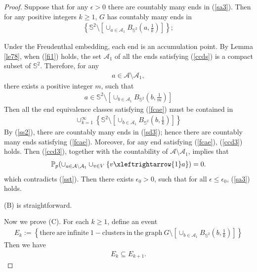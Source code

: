 \documentclass[11pt]{amsart}
\theoremstyle{plain}
\numberwithin{equation}{section}
\numberwithin{figure}{section}
\newcommand\PP{{\mathbb P}}
\begin{document}
\begin{proof}

Suppose that for any $\epsilon>0$ there are countably many ends in (\ref{sa3}). Then for any positive integers $k\geq 1$, $G$ has countably many ends in
\begin{align}
 \left\{\mathbb{S}^2\setminus \left[\cup_{a\in\mathcal{A}_1}B_{\mathbb{S}^2}\left(a,\frac{1}{k}\right)\right]\right\};\label{ss2}
\end{align}

Under the Freudenthal embedding, each end is an accumulation point.
By Lemma \ref{le78}, when (\ref{fi1}) holds, the set $\mathcal{A}_1$ of all the ends satisfying (\ref{ccds}) is a compact subset of $\mathbb{S}^2$. Therefore, for any  
\begin{align}
a\in\mathcal{A}\setminus \mathcal{A}_1,\label{fcae}
\end{align}
there exists a positive integer $m$, such that
\begin{align*}
a\in \mathbb{S}^2\setminus \left[\cup_{b\in\mathcal{A}_1}B_{\mathbb{S}^2}\left(b,\frac{1}{m}\right)\right]
\end{align*}
Then all the end equivalence classes satisfying (\ref{fcae}) must be contained in 
\begin{align}
\cup_{k=1}^{\infty} \left\{\mathbb{S}^2\setminus \left[\cup_{b\in\mathcal{A}_1}B_{\mathbb{S}^2}\left(b,\frac{1}{k}\right)\right]\right\}\label{sd3}
\end{align}
By (\ref{ss2}), there are countably many ends in (\ref{sd3}); hence there are countably many ends satisfying (\ref{fcae}). Moreover, for any end satisfying (\ref{fcae}), (\ref{ccd3}) holds. Then (\ref{ccd3}), together with the countability of $\mathcal{A}\setminus \mathcal{A}_1$, implies that
\begin{align*}
\PP_p(\cup_{a\in \mathcal{A}\setminus \mathcal{A}_1 }\cup_{v\in V}\{v\xleftrightarrow{1} a\})=0.
\end{align*}
which contradicts (\ref{sst}). Then there exists $\epsilon_0> 0$, such that for all $\epsilon\leq \epsilon_0$, (\ref{sa3}) holds. 


(B) is straightforward.

Now we prove (C). For each $k\geq 1$, define an event
\begin{align*}
E_{k}:=\left\{\mathrm{there\ are\ infinite\ 1-clusters\ in\ the\ graph}\ G\setminus \left[\cup_{b\in \mathcal{A}_1}B_{\mathbb{S}^2}\left(b,\frac{1}{k}\right)\right]\right\}
\end{align*}
Then we have
\begin{align*}
E_k\subseteq E_{k+1}.
\end{align*}


\end{proof}
\end{document}
